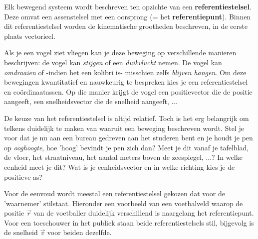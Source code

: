 \documentclass{ximera}
\begin{document}
	\author{Bart Lambregs}
    \xmsource\xmuitleg


Elk bewegend systeem wordt beschreven ten opzichte van een \textbf{referentiestelsel}. Deze omvat een assenstelsel met een oorsprong (= het \textbf{referentiepunt}).
Binnen dit referentiestelsel worden de kinematische grootheden beschreven, in de eerste plaats vectorieel. 
 
Als je een vogel ziet vliegen kan je deze beweging op verschillende manieren beschrijven: de vogel kan \textit{stijgen} of een \textit{duikvlucht} nemen. De vogel kan \textit{omdraaien} of -indien het een kolibri is- misschien zelfs \textit{blijven hangen}. Om deze bewegingen kwantitatief en nauwkeurig te bespreken kies je een referentiestelsel en coördinaatassen. Op die manier krijgt de vogel een positievector die de positie aangeeft, een snelheidsvector die de snelheid aangeeft, ... 

De keuze van het referentiestelsel is altijd relatief. Toch is het erg belangrijk om telkens duidelijk te maken van waaruit een beweging beschreven wordt.
Stel je voor dat je nu aan een bureau gedreven aan het studeren bent en je houdt je pen op \textit{ooghoogte}, hoe 'hoog' bevindt je pen zich dan? Meet je dit vanaf je tafelblad, de vloer, het straatniveau, het aantal meters boven de zeespiegel, ...? In welke eenheid meet je dit? Wat is je eenheidsvector en in welke richting kies je de positieve as? 

Voor de eenvoud wordt meestal een referentiestelsel gekozen dat voor de 'waarnemer' stilstaat. 
Hieronder een voorbeeld van een voetbalveld waarop de positie \(\vec{r}\) van de voetballer duidelijk verschillend is naargelang het referentiepunt.
Voor een toeschouwer in het publiek staan beide referentiestelsels stil, bijgevolg is de snelheid \(\vec{v}\) voor beiden dezelfde.


\end{document}
